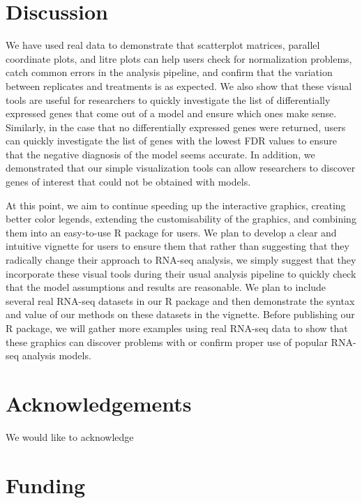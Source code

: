 \documentclass{bioinfo}
\begin{document}
\section{Discussion}

We have used real data to demonstrate that scatterplot matrices, parallel coordinate plots, and litre plots can help users check for normalization problems, catch common errors in the analysis pipeline, and confirm that the variation between replicates and treatments is as expected. We also show that these visual tools are useful for researchers to quickly investigate the list of differentially expressed genes that come out of a model and ensure which ones make sense. Similarly, in the case that no differentially expressed genes were returned, users can quickly investigate the list of genes with the lowest FDR values to ensure that the negative diagnosis of the model seems accurate. In addition, we demonstrated that our simple visualization tools can allow researchers to discover genes of interest that could not be obtained with models.

At this point, we aim to continue speeding up the interactive graphics, creating better color legends, extending the customisability of the graphics, and combining them into an easy-to-use \textsf{R} package for users. We plan to develop a clear and intuitive vignette for users to ensure them that rather than suggesting that they radically change their approach to RNA-seq analysis, we simply suggest that they incorporate these visual tools during their usual analysis pipeline to quickly check that the model assumptions and results are reasonable. We plan to include several real RNA-seq datasets in our \textsf{R} package and then demonstrate the syntax and value of our methods on these datasets in the vignette. Before publishing our \textsf{R} package, we will gather more examples using real RNA-seq data to show that these graphics can discover problems with or confirm proper use of popular RNA-seq analysis models.

\section*{Acknowledgements}

We would like to acknowledge 

\section*{Funding}
\end{document}
